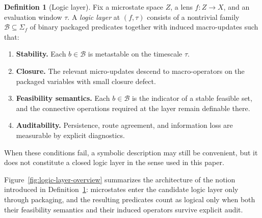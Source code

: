 \documentclass[11pt]{article}
\theoremstyle{definition}
\newtheorem{definition}{Definition}
\begin{document}
\begin{definition}[Logic layer]
\label{def:logic-layer}
Fix a microstate space \(Z\), a lens \(f : Z \to X\), and an evaluation window \(\tau\). A \emph{logic layer} at \((f,\tau)\) consists of a nontrivial family \(\mathcal{B} \subseteq \Sigma_f\) of binary packaged predicates together with induced macro-updates such that:
\begin{enumerate}
    \item \textbf{Stability.} Each \(b \in \mathcal{B}\) is metastable on the timescale \(\tau\).
    \item \textbf{Closure.} The relevant micro-updates descend to macro-operators on the packaged variables with small closure defect.
    \item \textbf{Feasibility semantics.} Each \(b \in \mathcal{B}\) is the indicator of a stable feasible set, and the connective operations required at the layer remain definable there.
    \item \textbf{Auditability.} Persistence, route agreement, and information loss are measurable by explicit diagnostics.
\end{enumerate}
When these conditions fail, a symbolic description may still be convenient, but it does not constitute a closed logic layer in the sense used in this paper.
\end{definition}

Figure~\ref{fig:logic-layer-overview} summarizes the architecture of the notion introduced in Definition~\ref{def:logic-layer}: microstates enter the candidate logic layer only through packaging, and the resulting predicates count as logical only when both their feasibility semantics and their induced operators survive explicit audit.
\end{document}
